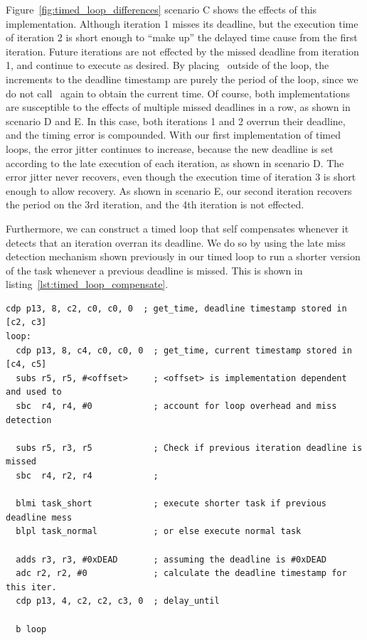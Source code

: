 Figure~\ref{fig:timed_loop_differences} scenario C shows the effects of this implementation. 
Although iteration 1 misses its deadline, but the execution time of iteration 2 is short enough to ``make up'' the delayed time cause from the first iteration.
Future iterations are not effected by the missed deadline from iteration 1, and continue to execute as desired.
By placing \gettime\ outside of the loop, the increments to the deadline timestamp are purely the period of the loop, since we do not call \gettime\ again to obtain the current time.
Of course, both implementations are susceptible to the effects of multiple missed deadlines in a row, as shown in scenario D and E.
In this case, both iterations 1 and 2 overrun their deadline, and the timing error is compounded.
With our first implementation of timed loops, the error jitter continues to increase, because the new deadline is set according to the late execution of each iteration, as shown in scenario D. 
The error jitter never recovers, even though the execution time of iteration 3 is short enough to allow recovery. 
As shown in scenario E, our second iteration recovers the period on the 3rd iteration, and the 4th iteration is not effected. 

Furthermore, we can construct a timed loop that self compensates whenever it detects that an iteration overran its deadline. 
We do so by using the late miss detection mechanism shown previously in our timed loop to run a shorter version of the task whenever a previous deadline is missed.
This is shown in listing~\ref{lst:timed_loop_compensate}. 
\begin{lstlisting}[float=h, label=lst:timed_loop_compensate,caption=Timed loops with compensation ]
  cdp p13, 8, c2, c0, c0, 0  ; get_time, deadline timestamp stored in [c2, c3]
loop:
  cdp p13, 8, c4, c0, c0, 0  ; get_time, current timestamp stored in [c4, c5]
  subs r5, r5, #<offset>     ; <offset> is implementation dependent and used to 
  sbc  r4, r4, #0            ; account for loop overhead and miss detection

  subs r5, r3, r5            ; Check if previous iteration deadline is missed
  sbc  r4, r2, r4            ; 

  blmi task_short            ; execute shorter task if previous deadline mess 
  blpl task_normal           ; or else execute normal task 
  
  adds r3, r3, #0xDEAD       ; assuming the deadline is #0xDEAD
  adc r2, r2, #0             ; calculate the deadline timestamp for this iter.
  cdp p13, 4, c2, c2, c3, 0  ; delay_until
   
  b loop
\end{lstlisting}

